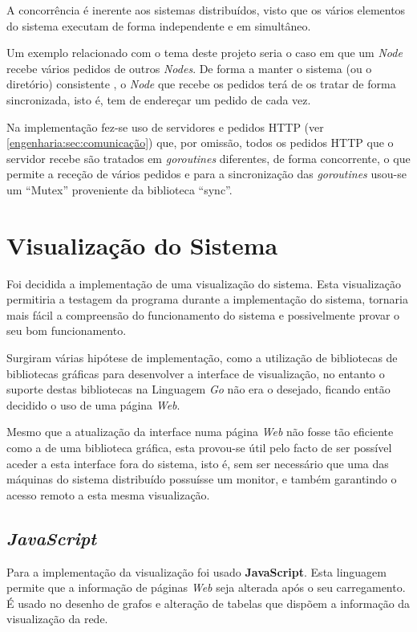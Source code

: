 A concorrência é inerente aos sistemas distribuídos, visto que os vários elementos do sistema executam de forma independente e em simultâneo.

Um exemplo relacionado com o tema deste projeto seria o caso em que um \emph{Node} recebe vários pedidos de outros \emph{Nodes}.
De forma a manter o sistema (ou o diretório) consistente ,
o \emph{Node} que recebe os pedidos terá de os tratar de forma sincronizada, isto é, tem de endereçar um pedido de cada vez.

Na implementação fez-se uso de servidores e pedidos \acs{HTTP} (ver \ref{engenharia:sec:comunicação}) que, por omissão,
todos os pedidos \acs{HTTP} que o servidor recebe são tratados em \emph{goroutines} diferentes,
de forma concorrente, o que permite a receção de vários pedidos e 
para a sincronização das \emph{goroutines} usou-se um ``Mutex'' proveniente da biblioteca ``sync''.





\section{Visualização do Sistema}
Foi decidida a implementação de uma visualização do sistema. 
Esta visualização permitiria a testagem da programa durante a implementação do sistema,
tornaria mais fácil a compreensão do funcionamento do sistema e possivelmente provar o seu bom funcionamento.

Surgiram várias hipótese de implementação, como a utilização de bibliotecas de bibliotecas gráficas para desenvolver a interface de visualização,
no entanto o suporte destas bibliotecas na Linguagem \emph{Go} não era o desejado, ficando então decidido o uso de uma página \emph{Web}.

Mesmo que a atualização da interface numa página \emph{Web} não fosse tão eficiente como a de uma biblioteca gráfica, esta provou-se útil 
pelo facto de ser possível aceder a esta interface fora do sistema, isto é, sem ser necessário que uma das máquinas do sistema distribuído possuísse 
um monitor, e também garantindo o acesso remoto a esta mesma visualização.

\subsection*{\emph{JavaScript}}
Para a implementação da visualização foi usado \textbf{JavaScript}.
Esta linguagem permite que a informação de páginas \emph{Web} seja alterada após o seu carregamento.
É usado no desenho de grafos e alteração de tabelas que dispõem a informação da visualização da rede.

